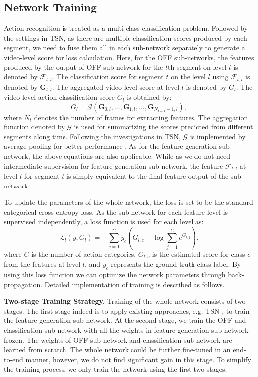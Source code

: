 \documentclass[10pt,twocolumn,letterpaper]{article}
\begin{document}
\subsection{Network Training}
Action recognition is treated as a multi-class classification problem. 
Followed by the settings in TSN, as there are multiple classification scores produced by each segment, we need to fuse them all in each sub-network separately to generate a video-level score for loss calculation. Here, for the OFF sub-networks, the features produced by the output of OFF sub-network for the $t$th segment on level $l$ is denoted by $\mathcal{F}_{t, l}$. The classification score for segment $t$ on the level $l$ using $\mathcal{F}_{t, l}$ is denoted by $\mathbf{G}_{t, l}$. The aggregated video-level score at level $l$ is denoted by $G_{l}$. The video-level action classification score $G_{l}$ is obtained by:
\begin{equation}
G_{l} = \mathcal{G}(\mathbf{G}_{0, l}, \ldots, \mathbf{G}_{1, l}, \ldots, \mathbf{G}_{N_{t-1}-1, l}),
\end{equation}
where $N_t$ denotes the number of frames for extracting features. The aggregation function denoted by $\mathcal{G}$ is used for summarizing the scores predicted from different segments along time. Following the investigations in TSN, $\mathcal{G}$ is implemented by average pooling for better performance \cite{wang2016tsn}. As for the feature generation sub-network, the above equations are also applicable. While as we do not need intermediate supervision for feature generation sub-network, the feature $\mathcal{F}_{t, l}$ at level $l$ for segment $t$ is simply equivalent to the final feature output of the sub-network.

To update the parameters of the whole network, the loss is set to be the standard categorical cross-entropy loss. As the sub-network for each feature level is supervised independently, a loss function is used for each level as:
\begin{equation}
\mathcal{L}_{l}(y, G_{l})=-\sum_{c=1}^{C}y_{c}(G_{l, c} - \log\sum_{j=1}^{C}e^{G_{l, j}}).
\end{equation}
where $C$ is the number of action categories, $G_{l, c}$ is the estimated score for class $c$ from the features at level $l$, and $y_c$ represents the ground-truth class label.
By using this loss function we can optimize the network parameters through back-propagation. Detailed implementation of training is described as follows.

\textbf{Two-stage Training Strategy.} Training of the whole network consists of two stages. The first stage indeed is to apply existing approaches, e.g. TSN \cite{wang2016tsn}, to train the feature generation sub-network. At the second stage, we train the OFF and classification sub-network with all the weights in feature generation sub-network frozen. The weights of OFF sub-network and classification sub-network are learned from scratch. 
The whole network could be further fine-tuned in an end-to-end manner, however, we do not find significant gain in this stage. To simplify the training process, we only train the network using the first two stages.
\end{document}

